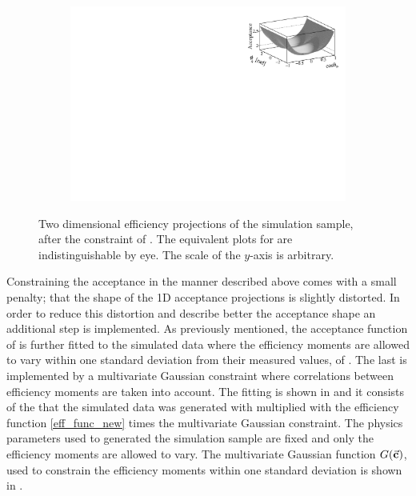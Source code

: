 \begin{figure}[t]
\begin{subfigure}{0.5\textwidth}
    \includegraphics[width=\textwidth]{Figures/Chapter4/canv_cosThL_phi_Sim08_3fb_hel_negKaons_all.pdf}
    \caption{}
    \label{eff2D_lp}
  \end{subfigure}
\caption{Two dimensional efficiency projections of the \BsJpsiKst simulation sample, after the constraint of .
         The equivalent plots for \BsbarJpsiKst are indistinguishable by eye. The scale of the $y$-axis is arbitrary.}
    \label{eff2D}
\end{figure}

Constraining the acceptance in the manner described above comes with a small penalty; that the shape of the 1D acceptance
projections is slightly distorted. In order to reduce this distortion and describe better the acceptance shape an additional step is implemented.
As previously mentioned, the acceptance function of  is further fitted to the simulated data
where the efficiency moments are allowed to vary within one standard deviation from their measured values, of .
The last is implemented by a multivariate Gaussian constraint where correlations between efficiency moments are taken into account.
The fitting \pdf is shown in  and it consists of the \pdf that the simulated
data was generated with multiplied with the efficiency function \eqref{eff_func_new} times the multivariate Gaussian constraint.
The physics parameters used to generated the simulation sample are fixed and only the efficiency moments are allowed to vary.
The multivariate Gaussian function $G(\vec{\bf{c}})$, used to constrain the efficiency moments within one standard deviation
is shown in .

